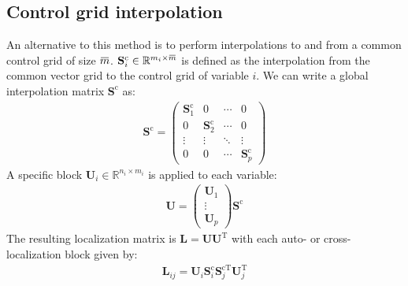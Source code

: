 \documentclass[12pt]{scrartcl}
\newcommand{\overbar}[1]{\mkern 1.5mu\overline{\mkern-1.5mu#1\mkern-1.5mu}\mkern 1.5mu}
\begin{document}
\subsection{Control grid interpolation}
An alternative to this method is to perform interpolations to and from a common control grid of size $\overbar{m}$. $\mathbf{S}^\mathrm{c}_i \in \mathbb{R}^{m_i \times \overbar{m}}$ is defined as the interpolation from the common vector grid to the control grid of variable $i$. We can write a global interpolation matrix $\mathbf{S}^\mathrm{c}$ as:
\begin{align}
\mathbf{S}^\mathrm{c} = \left( \begin{array}{cccc}
\mathbf{S}^\mathrm{c}_1 & 0 & \cdots & 0 \\
0 & \mathbf{S}^\mathrm{c}_2 & \cdots & 0 \\
\vdots & \vdots & \ddots & \vdots \\
0 & 0 & \cdots & \mathbf{S}^\mathrm{c}_p
\end{array} \right)
\end{align}
A specific block $\mathbf{U}_i \in \mathbb{R}^{n_i \times m_i}$ is applied to each variable:
\begin{align}
\mathbf{U} = \left( \begin{array}{c}
\mathbf{U}_1 \\
\vdots \\
\mathbf{U}_p
\end{array} \right) \mathbf{S}^\mathrm{c}
\end{align}
The resulting localization matrix is $\mathbf{L} = \mathbf{U} \mathbf{U}^\mathrm{T}$ with each auto- or cross-localization block given by:
\begin{align}
\mathbf{L}_{ij} = \mathbf{U}_i \mathbf{S}^\mathrm{c}_i \mathbf{S}_j^{\mathrm{c} \mathrm{T}} \mathbf{U}_j^\mathrm{T}
\end{align}
\end{document}
